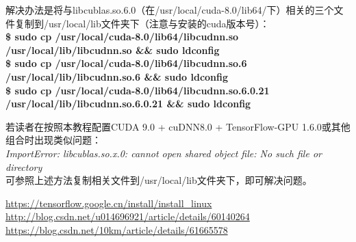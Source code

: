 \documentclass[11pt,a4paper]{ctexart}
\begin{document}
{\heiti  \color{green}解决办法是将与libcublas.so.6.0（在/usr/local/cuda-8.0/lib64/下）相关的三个文件复制到/usr/local/lib文件夹下（注意与安装的cuda版本号）}：\\
{\textbf {
\$ sudo cp /usr/local/cuda-8.0/lib64/libcudnn.so /usr/local/lib/libcudnn.so \&\& sudo ldconfig\\
\$ sudo cp /usr/local/cuda-8.0/lib64/libcudnn.so.6 /usr/local/lib/libcudnn.so.6 \&\& sudo ldconfig\\
\$ sudo cp /usr/local/cuda-8.0/lib64/libcudnn.so.6.0.21 /usr/local/lib/libcudnn.so.6.0.21 \&\& sudo ldconfig
}}


若读者在按照本教程配置CUDA 9.0 + cuDNN8.0 + TensorFlow-GPU 1.6.0或其他组合时出现类似问题：\\
{\emph{
ImportError: libcublas.so.{\color{red}x}.0: cannot open shared object file: No such file or directory
}}\\
{ \color{red} \heiti 可参照上述方法复制相关文件到/usr/local/lib文件夹下}，即可解决问题。



\begin{thebibliography}{99}  
 \url{https://tensorflow.google.cn/install/install_linux}
 \url{http://blog.csdn.net/u014696921/article/details/60140264}
 \url{https://blog.csdn.net/10km/article/details/61665578}
\end{thebibliography}  
\end{document}
